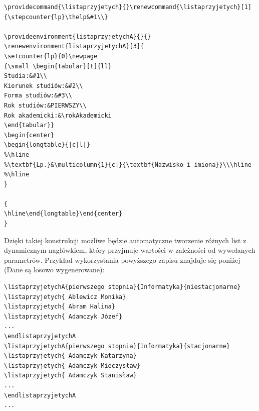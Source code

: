 \begin{lstlisting}
\providecommand{\listaprzyjetych}{}\renewcommand{\listaprzyjetych}[1]{\stepcounter{lp}\thelp&#1\\}

\provideenvironment{listaprzyjetychA}{}{}
\renewenvironment{listaprzyjetychA}[3]{
\setcounter{lp}{0}\newpage 
{\small \begin{tabular}[t]{ll}
Studia:&#1\\
Kierunek studiów:&#2\\
Forma studiów:&#3\\
Rok studiów:&PIERWSZY\\
Rok akademicki:&\rokAkademicki
\end{tabular}}
\begin{center}
\begin{longtable}{|c|l|}
%\hline
%\textbf{Lp.}&\multicolumn{1}{c|}{\textbf{Nazwisko i imiona}}\\\hline 
%\hline
}

{
\hline\end{longtable}\end{center}
}
\end{lstlisting}

Dzięki takiej konstrukcji możliwe będzie automatyczne tworzenie różnych list z dynamicznym nagłówkiem, który przyjmuje wartości w zależności od wywołanych parametrów. Przykład wykorzystania powyższego zapisu znajduje się poniżej (Dane są losowo wygenerowane):

\begin{lstlisting}
\listaprzyjetychA{pierwszego stopnia}{Informatyka}{niestacjonarne}
\listaprzyjetych{ Ablewicz Monika}
\listaprzyjetych{ Abram Halina}
\listaprzyjetych{ Adamczyk Józef}
...
\endlistaprzyjetychA
\listaprzyjetychA{pierwszego stopnia}{Informatyka}{stacjonarne}
\listaprzyjetych{ Adamczyk Katarzyna}
\listaprzyjetych{ Adamczyk Mieczysław}
\listaprzyjetych{ Adamczyk Stanisław}
...
\endlistaprzyjetychA
...
\end{lstlisting}
